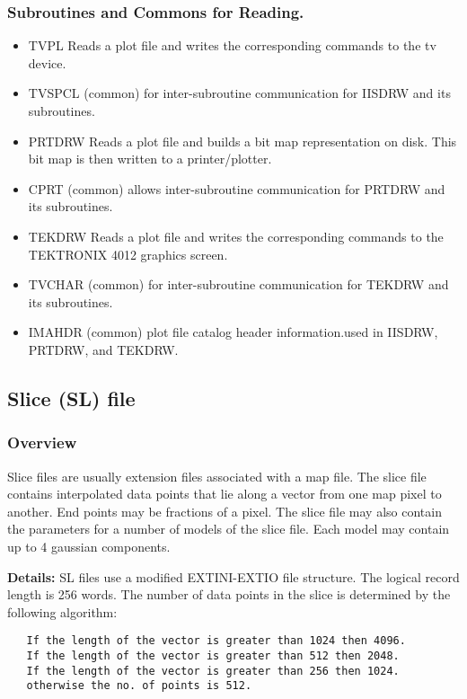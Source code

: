 \subsubsection{Subroutines and Commons for Reading.}
\begin{itemize}
\item TVPL     Reads a plot file and writes the
corresponding commands
to the tv device.
\item TVSPCL   (common) for inter-subroutine communication for IISDRW and
its subroutines.
\item PRTDRW   Reads a plot file and builds a bit map
representation on disk.  This bit map is then written to a
printer/plotter.
\item CPRT     (common) allows inter-subroutine communication for PRTDRW
and its subroutines.
\item TEKDRW   Reads a plot file and writes the
corresponding commands
to the TEKTRONIX 4012 graphics screen.
\item TVCHAR   (common) for inter-subroutine communication for TEKDRW and
its subroutines.
\item IMAHDR   (common) plot file catalog header information.used in
IISDRW, PRTDRW, and TEKDRW.
\end{itemize}

\subsection{Slice (SL) file}
\subsubsection{Overview}

 Slice files are usually extension files associated with
a map file.  The slice file contains interpolated data points
that lie along a vector from one map pixel to another.  End points
may be fractions of a pixel.  The slice file may also contain the
parameters for a number of models of the slice file.  Each model
may contain up to 4 gaussian components.

{\bf Details:} SL files use a modified EXTINI-EXTIO file structure.
The logical record length is 256 words.
The number of data points in the slice is determined by the
following algorithm:
\begin{verbatim}
   If the length of the vector is greater than 1024 then 4096.
   If the length of the vector is greater than 512 then 2048.
   If the length of the vector is greater than 256 then 1024.
   otherwise the no. of points is 512.
\end{verbatim}



